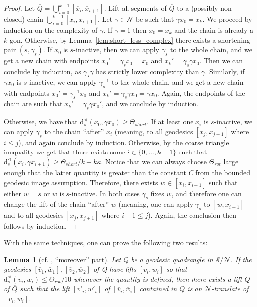 \documentclass[svgnames]{amsart}
\theoremstyle{plain}
\newtheorem{lemma}[thm]{Lemma}
\theoremstyle{definition}
\newcommand{\ov}[1]{\overline{#1}}
\newcommand{\dist}{\mathrm{d}}
\newcommand{\N}{\mathcal{N}}
\newcommand{\calS}{\mathcal{S}}
\renewcommand{\angle}{\sphericalangle}
\begin{document}
\begin{proof}
Let $\ov Q=\bigcup_{i=0}^{k-1}[\ov x_i, \ov x_{i+1}]$. 
Lift all segments of $\ov Q$ to a (possibly non-closed) chain $\bigcup_{i=0}^{k-1}[x_i, x_{i+1}]$. Let $\gamma\in \N$ be such that $\gamma x_0=x_k$. We proceed by induction on the complexity of $\gamma$.
If $\gamma=1$ then $x_0=x_k$ and the chain is already a $k$-gon. Otherwise, by Lemma~\ref{lem:short_less_complex} there exists a shortening pair $(s,\gamma_s)$. If $x_0$ is $s$-inactive, then we can apply $\gamma_s$ to the whole chain, and we get a new chain with endpoints $x_0'=\gamma_s x_0=x_0$ and $x_k'=\gamma_s\gamma x_0$. Then we can conclude by induction, as $\gamma_s\gamma$ has strictly lower complexity than $\gamma$. Similarly, if $\gamma x_0$ is $s$-inactive, we can apply $\gamma_s^{-1}$ to the whole chain, and we get a new chain with endpoints $x_0'=\gamma_s^{-1}x_0$ and $x_k'=\gamma_s\gamma x_0=\gamma x_0$. Again, the endpoints of the chain are such that $x_k'=\gamma_s\gamma x_0'$, and we conclude by induction.

Otherwise, we have that $\dist^\angle_s(x_0, \gamma x_0)\ge \Theta_{short}$. If at least one $x_i$ is $s$-inactive, we can apply $\gamma_s$ to the chain “after” $x_i$ (meaning, to all geodesics $[x_j,x_{j+1}]$ where $i\le j$), and again conclude by induction. Otherwise, by the coarse triangle inequality we get that there exists some $i\in\{0,\ldots, k-1\}$ such that $\dist^\angle_s(x_i, \gamma x_{i+1})\ge \Theta_{short}/k-k\kappa$. Notice that we can always choose $\Theta_{rot}$ large enough that the latter quantity is greater than the constant $C$ from the bounded geodesic image assumption. Therefore, there exists $w\in [x_i,x_{i+1}]$ such that either $w=s$ or $w$ is $s$-inactive. In both cases $\gamma_s$ fixes $w$, and therefore one can change the lift of the chain “after” $w$ (meaning, one can apply $\gamma_s$ to $[w,x_{i+1}]$ and to all geodesics $[x_j,x_{j+1}]$ where $i+1\le j$). Again, the conclusion then follows by induction.
\end{proof}




With the same techniques, one can prove the following two results:

\begin{lemma}[{cf. \cite[Proposition 4.3]{dfdt}, “moreover” part}]\label{lem:quadranglelift_if_thetarot/10_ge} Let $\ov Q$ be a geodesic quadrangle in $\calS/\N$. If the geodesics $[\ov v_1, \ov w_1]$, $[\ov v_2, \ov w_2]$ of Q have lifts $[v_i, w_i]$ so that
$\dist^\angle_s(v_i, w_i) \le\Theta_{rot}/10$ whenever the quantity is defined, then there exists a lift $Q$ of $\ov Q$ such that the lift $[v'_i, w'_i]$ of
$[\ov v_i, \ov w_i]$ contained in $Q$ is an $\N$-translate of $[v_i, w_i]$.
\end{lemma}
\end{document}
